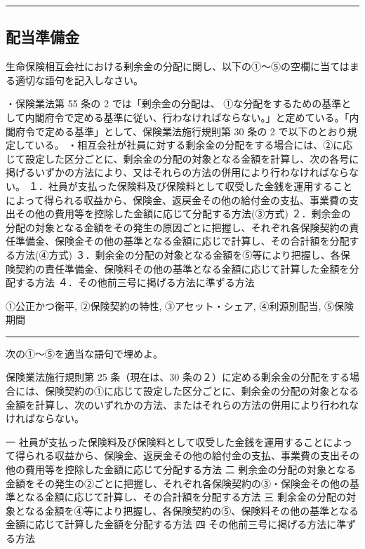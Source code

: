 \documentclass[report,gutter=10mm,fore-edge=10mm,uplatex,dvipdfmx]{jlreq}
\begin{document}
\begin{center}\rule{0.5\linewidth}{0.5pt}\end{center}

\subsection{配当準備金}


生命保険相互会社における剰余金の分配に関し、以下の①～⑤の空欄に当てはまる適切な語句を記入しなさい。

・保険業法第 55 条の 2 では「剰余金の分配は、
①な分配をするための基準として内閣府令で定める基準に従い、行わなければならない。」と定めている。「内閣府令で定める基準」として、保険業法施行規則第
30 条の 2 で以下のとおり規定している。
・相互会社が社員に対する剰余金の分配をする場合には、②に応じて設定した区分ごとに、剰余金の分配の対象となる金額を計算し、次の各号に掲げるいずかの方法により、又はそれらの方法の併用により行わなければならない。
１．社員が支払った保険料及び保険料として収受した金銭を運用することによって得られる収益から、保険金、返戻金その他の給付金の支払、事業費の支出その他の費用等を控除した金額に応じて分配する方法(③方式)
２．剰余金の分配の対象となる金額をその発生の原因ごとに把握し、それぞれ各保険契約の責任準備金、保険金その他の基準となる金額に応じで計算し、その合計額を分配する方法(④方式)
３．剰余金の分配の対象となる金額を⑤等により把握し、各保険契約の責任準備金、保険料その他の基準となる金額に応じて計算した金額を分配する方法
４．その他前三号に掲げる方法に準ずる方法


①公正かつ衡平, ②保険契約の特性, ③アセット・シェア, ④利源別配当,
⑤保険期間

\begin{center}\rule{0.5\linewidth}{0.5pt}\end{center}


次の①～⑤を適当な語句で埋めよ。

保険業法施行規則第 25 条（現在は、30
条の２）に定める剰余金の分配をする場合には、保険契約の①に応じて設定した区分ごとに、剰余金の分配の対象となる金額を計算し、次のいずれかの方法、またはそれらの方法の併用により行われなければならない。

一
社員が支払った保険料及び保険料として収受した金銭を運用することによって得られる収益から、保険金、返戻金その他の給付金の支払、事業費の支出その他の費用等を控除した金額に応じて分配する方法
二
剰余金の分配の対象となる金額をその発生の②ごとに把握し、それぞれ各保険契約の③・保険金その他の基準となる金額に応じて計算し、その合計額を分配する方法
三
剰余金の分配の対象となる金額を④等により把握し、各保険契約の⑤、保険料その他の基準となる金額に応じて計算した金額を分配する方法
四 その他前三号に掲げる方法に準ずる方法
\end{document}
